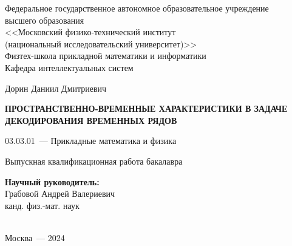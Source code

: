 \thispagestyle{empty}

\begin{titlepage}
%
\begin{center}
Федеральное государственное автономное образовательное учреждение\\ высшего образования\\
<<Московский физико-технический институт\\
(национальный исследовательский университет)>>\\
Физтех-школа прикладной математики и информатики\\
Кафедра интеллектуальных систем
\end{center}
%
\vspace{0pt plus5fill}
%
\begin{center}
\large{Дорин Даниил Дмитриевич}
\end{center}
%
\vspace{0pt}
%
\begin{center}
\textbf{\large{\MakeUppercase{Пространственно-временные характеристики в задаче декодирования временных рядов}}}
\end{center}
%
\vspace{0pt}
%
\begin{center}
03.03.01~--- Прикладные математика и физика
\end{center}
%
\vspace{0pt}
%
\begin{center}
Выпускная квалификационная работа бакалавра
\end{center}
%
\vspace{0pt plus2fill}
%
\begin{center}
\hfill\parbox{8,4cm}{\textbf{Научный руководитель:}\\
Грабовой Андрей Валериевич\\
канд. физ.-мат. наук}\\
\vspace{0pt plus4fill}
Москва~--- 2024    
\end{center}
%
\end{titlepage}